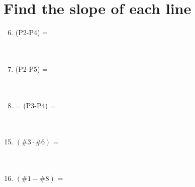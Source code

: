 \documentclass[12pt]{article}
\begin{document}
\section{Find the slope of each line}
\begin{minipage}[t]{0.6\textwidth}
    \begin{enumerate}
        \setcounter{enumi}{5} 
        \item (P2-P4) = %
        \\\\\\
        \item (P2-P5) = %
        \\\\\\
        \item = (P3-P4) = %
        \\\\\\
    \end{enumerate}
\end{minipage}
\begin{minipage}[t]{0.6\textwidth}
    \begin{enumerate}[\#1]
        \setcounter{enumi}{14}
        \item $(\#3 \cdot \#6)$ = %
        \\\\\\
        \item $(\#1 - \#8)$ = %
        \\\\\\
        \\\\\\
    \end{enumerate}
\end{minipage}
\end{document}
